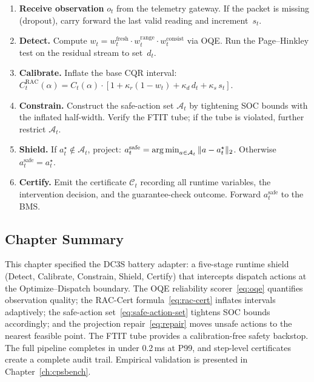 \begin{enumerate}
  \item \textbf{Receive observation} $o_t$ from the telemetry gateway.
    If the packet is missing (dropout), carry forward the last valid reading
    and increment~$s_t$.

  \item \textbf{Detect.}  Compute $w_t = w_t^{\mathrm{fresh}} \cdot
    w_t^{\mathrm{range}} \cdot w_t^{\mathrm{consist}}$ via OQE.
    Run the Page--Hinkley test on the residual stream to set~$d_t$.

  \item \textbf{Calibrate.}  Inflate the base CQR interval:
    $C_t^{\mathrm{RAC}}(\alpha) = C_t(\alpha) \cdot
    [1 + \kappa_r(1-w_t) + \kappa_d\,d_t + \kappa_s\,s_t]$.

  \item \textbf{Constrain.}  Construct the safe-action set $\mathcal{A}_t$
    by tightening SOC bounds with the inflated half-width.  Verify the
    FTIT tube; if the tube is violated, further restrict $\mathcal{A}_t$.

  \item \textbf{Shield.}  If $a_t^\star \notin \mathcal{A}_t$, project:
    $a_t^{\mathrm{safe}} = \operatorname*{arg\,min}_{a \in \mathcal{A}_t} \|a - a_t^\star\|_2$.
    Otherwise $a_t^{\mathrm{safe}} = a_t^\star$.

  \item \textbf{Certify.}  Emit the certificate $\mathcal{C}_t$ recording
    all runtime variables, the intervention decision, and the
    guarantee-check outcome.  Forward $a_t^{\mathrm{safe}}$ to the BMS.
\end{enumerate}

\subsection{Chapter Summary}

This chapter specified the DC3S battery adapter: a five-stage runtime shield
(Detect, Calibrate, Constrain, Shield, Certify) that intercepts dispatch
actions at the Optimize--Dispatch boundary.  The OQE reliability
scorer~\eqref{eq:oqe} quantifies observation quality; the RAC-Cert
formula~\eqref{eq:rac-cert} inflates intervals adaptively; the safe-action
set~\eqref{eq:safe-action-set} tightens SOC bounds accordingly; and the
projection repair~\eqref{eq:repair} moves unsafe actions to the nearest
feasible point.  The FTIT tube provides a calibration-free safety backstop.
The full pipeline completes in under 0.2\,ms at P99, and step-level
certificates create a complete audit trail.  Empirical validation is
presented in Chapter~\ref{ch:cpsbench}.


